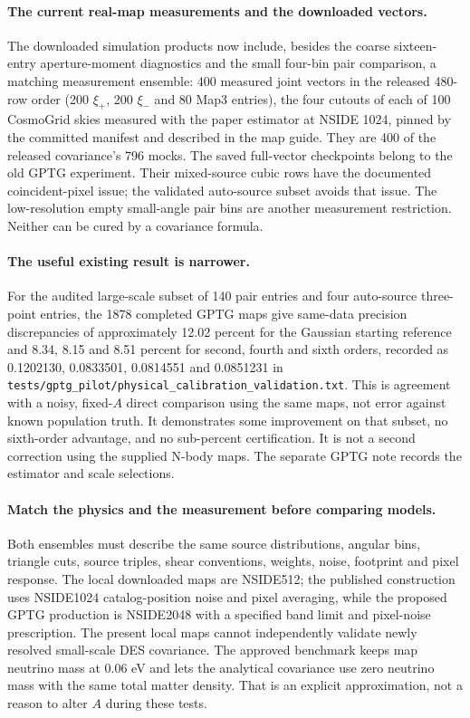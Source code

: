 \documentclass[11pt]{article}
\begin{document}
\paragraph{The current real-map measurements and the downloaded vectors.}
The downloaded simulation products now include, besides the coarse
sixteen-entry aperture-moment diagnostics and the small four-bin pair
comparison, a matching measurement ensemble: 400 measured joint vectors in
the released 480-row order (200 $\xi_+$, 200 $\xi_-$ and 80 Map3
entries), the four cutouts of each of 100 CosmoGrid skies measured with
the paper estimator at NSIDE 1024, pinned by the committed manifest and
described in the map guide. They are 400 of the released covariance's 796
mocks. The saved full-vector checkpoints belong
to the old GPTG experiment. Their mixed-source cubic rows have the
documented coincident-pixel issue; the validated auto-source subset avoids
that issue. The low-resolution empty small-angle pair bins are another
measurement restriction. Neither can be cured by a covariance formula.

\paragraph{The useful existing result is narrower.}
For the audited large-scale subset of 140 pair entries and four auto-source
three-point entries, the 1878 completed GPTG maps give same-data precision
discrepancies of approximately 12.02 percent for the Gaussian starting
reference and 8.34, 8.15 and 8.51 percent for second, fourth and sixth
orders, recorded as 0.1202130, 0.0833501, 0.0814551 and 0.0851231 in
\nolinkurl{tests/gptg_pilot/physical_calibration_validation.txt}. This is agreement with a noisy, fixed-$A$ direct comparison using
the same maps, not error against known population truth. It demonstrates
some improvement on that subset, no sixth-order advantage, and no
sub-percent certification. It is not a second correction using the
supplied N-body maps. The separate GPTG note records the estimator and
scale selections.

\paragraph{Match the physics and the measurement before comparing models.}
Both ensembles must describe the same source distributions, angular bins,
triangle cuts, source triples, shear conventions, weights, noise,
footprint and pixel response. The local downloaded maps are NSIDE512; the
published construction~\cite{gomes} uses NSIDE1024 catalog-position noise and pixel
averaging, while the proposed GPTG production is NSIDE2048 with a specified
band limit and pixel-noise prescription. The present local maps cannot
independently validate newly resolved small-scale DES covariance. The
approved benchmark keeps map neutrino mass at 0.06 eV and lets the
analytical covariance use zero neutrino mass with the same total matter
density. That is an explicit approximation, not a reason to alter $A$
during these tests.
\end{document}
